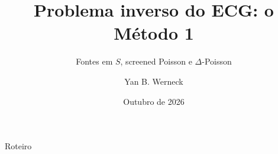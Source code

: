 \documentclass[aspectratio=169,11pt]{beamer}
\title{Problema inverso do ECG: o Método 1}
\subtitle{Fontes em $S$, screened Poisson e $\Delta$-Poisson}
\author{Yan B. Werneck}
\date{Outubro de 2026}
\begin{document}
\maketitle

\begin{frame}{Roteiro}
  \tableofcontents
\end{frame}







\end{document}
